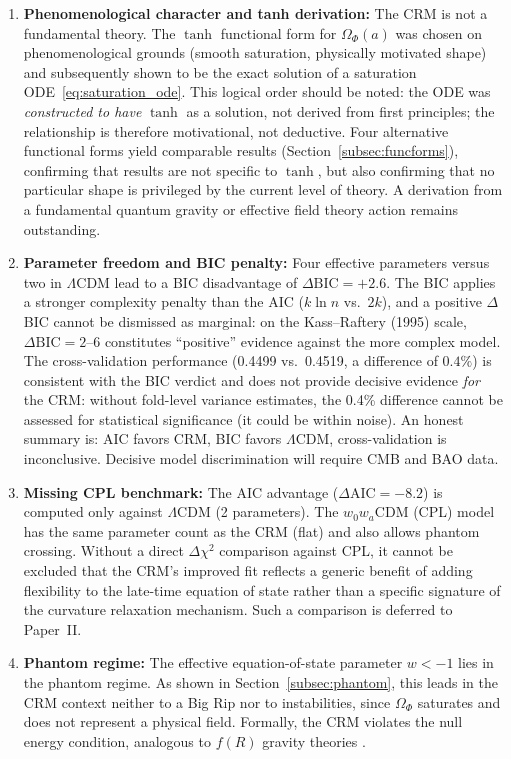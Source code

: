 \documentclass[aps,prd,twocolumn,superscriptaddress,nofootinbib]{revtex4-2}
\begin{document}
\begin{enumerate}
\item \textbf{Phenomenological character and tanh derivation:} The CRM is not a fundamental theory. The $\tanh$ functional form for $\Omega_\Phi(a)$ was chosen on phenomenological grounds (smooth saturation, physically motivated shape) and subsequently shown to be the exact solution of a saturation ODE~\eqref{eq:saturation_ode}. This logical order should be noted: the ODE was \textit{constructed to have} $\tanh$ as a solution, not derived from first principles; the relationship is therefore motivational, not deductive. Four alternative functional forms yield comparable results (Section~\ref{subsec:funcforms}), confirming that results are not specific to $\tanh$, but also confirming that no particular shape is privileged by the current level of theory. A derivation from a fundamental quantum gravity or effective field theory action remains outstanding.
\item \textbf{Parameter freedom and BIC penalty:} Four effective parameters versus two in $\Lambda$CDM lead to a BIC disadvantage of $\Delta\mathrm{BIC} = +2.6$. The BIC applies a stronger complexity penalty than the AIC ($k\ln n$ vs.\ $2k$), and a positive $\Delta$BIC cannot be dismissed as marginal: on the Kass--Raftery (1995) scale, $\Delta\mathrm{BIC} = 2$--$6$ constitutes ``positive'' evidence against the more complex model. The cross-validation performance (0.4499 vs.\ 0.4519, a difference of $0.4\%$) is consistent with the BIC verdict and does not provide decisive evidence \textit{for} the CRM: without fold-level variance estimates, the 0.4\% difference cannot be assessed for statistical significance (it could be within noise). An honest summary is: AIC favors CRM, BIC favors $\Lambda$CDM, cross-validation is inconclusive. Decisive model discrimination will require CMB and BAO data.
\item \textbf{Missing CPL benchmark:} The AIC advantage ($\Delta\mathrm{AIC} = -8.2$) is computed only against $\Lambda$CDM (2 parameters). The $w_0w_a$CDM (CPL) model \cite{Chevallier2001, Linder2003} has the same parameter count as the CRM (flat) and also allows phantom crossing. Without a direct $\Delta\chi^2$ comparison against CPL, it cannot be excluded that the CRM's improved fit reflects a generic benefit of adding flexibility to the late-time equation of state rather than a specific signature of the curvature relaxation mechanism. Such a comparison is deferred to Paper~II.
\item \textbf{Phantom regime:} The effective equation-of-state parameter $w < -1$ lies in the phantom regime. As shown in Section~\ref{subsec:phantom}, this leads in the CRM context neither to a Big Rip nor to instabilities, since $\Omega_\Phi$ saturates and does not represent a physical field. Formally, the CRM violates the null energy condition, analogous to $f(R)$ gravity theories \cite{Sotiriou2010}.

\end{enumerate}
\end{document}
